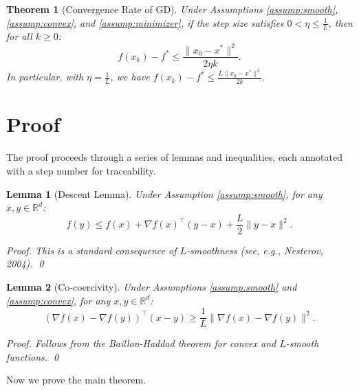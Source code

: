 \documentclass{article}
\newtheorem{theorem}{Theorem}
\newtheorem{lemma}{Lemma}
\begin{document}
\begin{theorem}[Convergence Rate of GD] \label{thm:gd_convergence}
    Under Assumptions \ref{assump:smooth}, \ref{assump:convex}, and \ref{assump:minimizer}, if the step size satisfies $0 < \eta \le \frac{1}{L}$, then for all $k \ge 0$:
    \begin{equation}
        f(x_k) - f^* \le \frac{\|x_0 - x^*\|^2}{2\eta k}.
    \end{equation}
    In particular, with $\eta = \frac{1}{L}$, we have $f(x_k) - f^* \le \frac{L \|x_0 - x^*\|^2}{2k}$.
\end{theorem}

\section{Proof}

The proof proceeds through a series of lemmas and inequalities, each annotated with a step number for traceability.

\begin{lemma}[Descent Lemma] \label{lem:descent}
    Under Assumption \ref{assump:smooth}, for any $x, y \in \mathbb{R}^d$:
    \begin{equation}
        f(y) \le f(x) + \nabla f(x)^\top (y - x) + \frac{L}{2} \|y - x\|^2.
    \end{equation}
    \begin{proof}
        This is a standard consequence of $L$-smoothness (see, e.g., Nesterov, 2004). \qed
    \end{proof}
\end{lemma}

\begin{lemma}[Co-coercivity] \label{lem:cocoercive}
    Under Assumptions \ref{assump:smooth} and \ref{assump:convex}, for any $x, y \in \mathbb{R}^d$:
    \begin{equation}
        (\nabla f(x) - \nabla f(y))^\top (x - y) \ge \frac{1}{L} \|\nabla f(x) - \nabla f(y)\|^2.
    \end{equation}
    \begin{proof}
        Follows from the Baillon-Haddad theorem for convex and $L$-smooth functions. \qed
    \end{proof}
\end{lemma}

Now we prove the main theorem.
\end{document}
